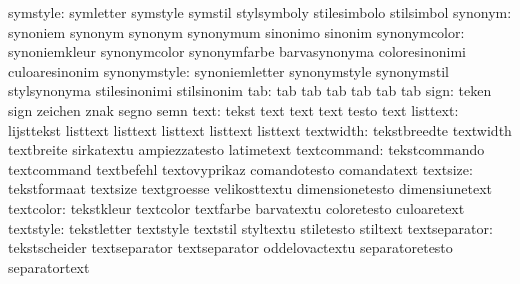                  symstyle: symletter                 symstyle
                           symstil                   stylsymboly
                           stilesimbolo              stilsimbol
                  synonym: synoniem                  synonym
                           synonym                   synonymum
                           sinonimo                  sinonim
             synonymcolor: synoniemkleur             synonymcolor
                           synonymfarbe              barvasynonyma
                           coloresinonimi            culoaresinonim
             synonymstyle: synoniemletter            synonymstyle
                           synonymstil               stylsynonyma
                           stilesinonimi             stilsinonim
                      tab: tab                       tab
                           tab                       tab
                           tab                       tab
                     sign: teken                     sign
                           zeichen                   znak
                           segno                     semn
                     text: tekst                     text
                           text                      text
                           testo                     text
                 listtext: lijsttekst                listtext
                           listtext                  listtext
                           listtext                  listtext
                textwidth: tekstbreedte              textwidth
                           textbreite                sirkatextu
                           ampiezzatesto             latimetext
              textcommand: tekstcommando             textcommand
                           textbefehl                textovyprikaz
                           comandotesto              comandatext
                 textsize: tekstformaat              textsize
                           textgroesse               velikosttextu
                           dimensionetesto           dimensiunetext
                textcolor: tekstkleur                textcolor
                           textfarbe                 barvatextu
                           coloretesto               culoaretext
                textstyle: tekstletter               textstyle
                           textstil                  styltextu
                           stiletesto                stiltext
            textseparator: tekstscheider             textseparator
                           textseparator             oddelovactextu
                           separatoretesto           separatortext
